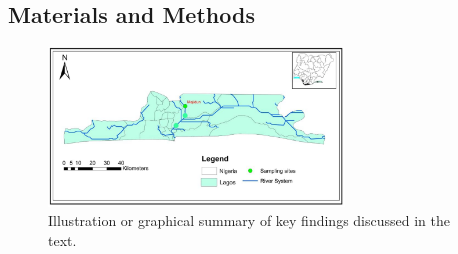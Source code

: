 \begin{adjustwidth}{0.35\textwidth}{0pt}

\section*{Materials and Methods}
\lipsum[3-4]

\vspace{1em}
\begin{figure}[H]
  \centering
  \includegraphics[width=0.7\textwidth]{images/materials-figure.png}
  \caption{Illustration or graphical summary of key findings discussed in the text.}
  \label{fig:materials-figure}
\end{figure}
\vspace{1em}

\end{adjustwidth}